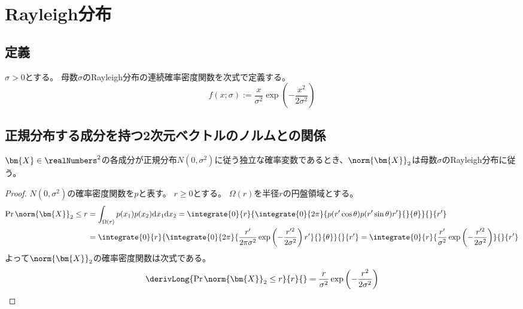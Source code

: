 \chapter{Rayleigh分布}
    \section{定義}
        \begin{shadebox}
            $\sigma>0$とする。
            母数$\sigma$のRayleigh分布の連続確率密度関数を次式で定義する。
            \[ f(x;\sigma) := \frac{x}{\sigma^2}\exp\left(-\frac{x^2}{2\sigma^2}\right) \]
        \end{shadebox}
    \section{正規分布する成分を持つ2次元ベクトルのノルムとの関係}
        \begin{shadebox}
            $\bm{X}\in\realNumbers^2$の各成分が正規分布$N(0,\sigma^2)$に従う独立な確率変数であるとき、$\norm{\bm{X}}_2$は母数$\sigma$のRayleigh分布に従う。
        \end{shadebox}
        \begin{proof}
            \quad\par
            $N(0,\sigma^2)$の確率密度関数を$p$と表す。
            $r\geq 0$とする。
            $\Omega(r)$を半径$r$の円盤領域とする。
            \begin{align*}
                \Pr{\norm{\bm{X}}_2 \leq r} &= \int_{\Omega(r)} p(x_1)p(x_2) \mathrm{d}x_1\mathrm{d}x_2 = \integrate{0}{r}{\integrate{0}{2\pi}{p(r'\cos\theta)p(r'\sin\theta)r'}{}{\theta}}{}{r'} \\
                &= \integrate{0}{r}{\integrate{0}{2\pi}{\frac{r'}{2\pi\sigma^2}\exp\left(-\frac{r'^2}{2\sigma^2}\right)r'}{}{\theta}}{}{r'} = \integrate{0}{r}{\frac{r'}{\sigma^2}\exp\left(-\frac{r'^2}{2\sigma^2}\right)}{}{r'}
            \end{align*}
            よって$\norm{\bm{X}}_2$の確率密度関数は次式である。
            \[ \derivLong{\Pr{\norm{\bm{X}}_2 \leq r}}{r}{} = \frac{r}{\sigma^2}\exp\left(-\frac{r^2}{2\sigma^2}\right) \]
        \end{proof}
